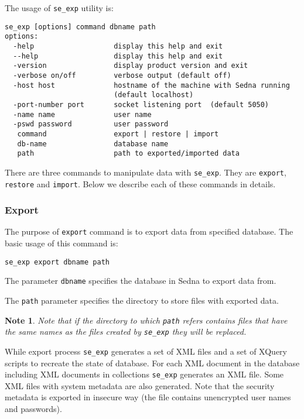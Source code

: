 \documentclass[a4paper,12pt]{article}
\newtheorem{note}{Note}
\begin{document}
The usage of \verb!se_exp! utility is:

\begin{verbatim}
se_exp [options] command dbname path
options:
  -help                   display this help and exit
  --help                  display this help and exit
  -version                display product version and exit
  -verbose on/off         verbose output (default off)
  -host host              hostname of the machine with Sedna running
                          (default localhost)
  -port-number port       socket listening port  (default 5050)
  -name name              user name
  -pswd password          user password
   command                export | restore | import
   db-name                database name
   path                   path to exported/imported data
\end{verbatim}


There are three commands to manipulate data with \verb!se_exp!. They are \verb!export!,
\verb!restore! and \verb!import!. Below we describe each of these commands in details.




\subsubsection*{Export}
The purpose of \verb!export! command is to export data from specified database. The basic usage 
of this command is:

\begin{verbatim}
se_exp export dbname path
\end{verbatim}

The parameter \verb!dbname! specifies the database in Sedna to export data from. 

The \verb!path! parameter specifies the directory to store files with exported data. 

\begin{note}
Note that if the directory to which \verb!path! refers contains files that have the same names as the files created by \verb!se_exp! they will be replaced. 
\end{note}

While export process \verb!se_exp! generates a set of XML files and a set of XQuery scripts to 
recreate the state of database. For each XML document in the database including XML documents in
collections \verb!se_exp! generates an XML file. Some XML files with system metadata are also
generated. Note that the security metadata is exported in insecure way (the file contains 
unencrypted user names and passwords).
\end{document}
